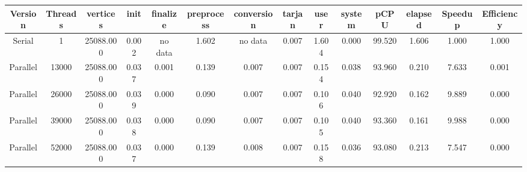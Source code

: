 \begin{tabular}{|c|c|c|c|c|c|c|c|c|c|c|c|c|c|}
\toprule
 Version &  Threads &  vertices &  init & finalize &  preprocess & conversion &  tarjan &  user &  system &   pCPU &  elapsed &  Speedup &  Efficiency \\
\midrule
  Serial &        1 & 25088.000 & 0.002 &  no data &       1.602 &    no data &   0.007 & 1.604 &   0.000 & 99.520 &    1.606 &    1.000 &       1.000 \\
Parallel &    13000 & 25088.000 & 0.037 &    0.001 &       0.139 &      0.007 &   0.007 & 0.154 &   0.038 & 93.960 &    0.210 &    7.633 &       0.001 \\
Parallel &    26000 & 25088.000 & 0.039 &    0.000 &       0.090 &      0.007 &   0.007 & 0.106 &   0.040 & 92.920 &    0.162 &    9.889 &       0.000 \\
Parallel &    39000 & 25088.000 & 0.038 &    0.000 &       0.090 &      0.007 &   0.007 & 0.105 &   0.040 & 93.360 &    0.161 &    9.988 &       0.000 \\
Parallel &    52000 & 25088.000 & 0.037 &    0.000 &       0.139 &      0.008 &   0.007 & 0.158 &   0.036 & 93.080 &    0.213 &    7.547 &       0.000 \\
\bottomrule
\end{tabular}
